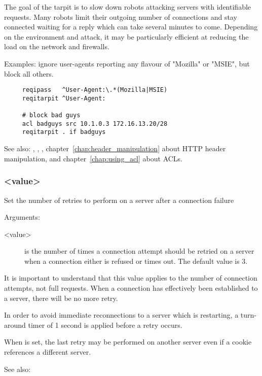 {  The goal of the tarpit is to slow down robots attacking servers with
  identifiable requests. Many robots limit their outgoing number of connections
  and stay connected waiting for a reply which can take several minutes to
  come. Depending on the environment and attack, it may be particularly
  efficient at reducing the load on the network and firewalls.

  Examples: ignore user-agents reporting any flavour of "Mozilla" or "MSIE", but block all others.
  \begin{verbatim}
     reqipass   ^User-Agent:\.*(Mozilla|MSIE)
     reqitarpit ^User-Agent:

     # block bad guys
     acl badguys src 10.1.0.3 172.16.13.20/28
     reqitarpit . if badguys
  \end{verbatim}

  See also: , , , chapter~\ref{chap:header_manipulation} about HTTP header
            manipulation, and chapter~\ref{chap:using_acl} about ACLs.

\subsubsection[retries]{ <value>}

  Set the number of retries to perform on a server after a connection failure


  Arguments:
  \begin{description}
  \item[<value>] is the number of times a connection attempt should be retried on
              a server when a connection either is refused or times out. The
              default value is 3.
  \end{description}
  
  It is important to understand that this value applies to the number of
  connection attempts, not full requests. When a connection has effectively
  been established to a server, there will be no more retry.

  In order to avoid immediate reconnections to a server which is restarting,
  a turn-around timer of 1 second is applied before a retry occurs.

  When  is set, the last retry may be performed on another
  server even if a cookie references a different server.

  See also: 

}
